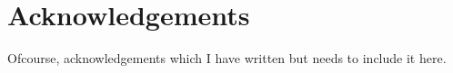 \chapter{Acknowledgements}
\label{acknowledgements}

Ofcourse, acknowledgements which I have written but needs to include it here.

